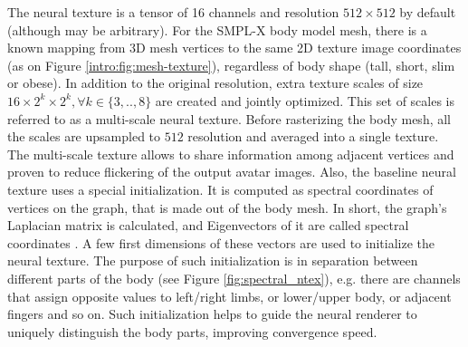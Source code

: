 
The neural texture is a tensor of 16 channels and resolution $512\times512$ by default (although may be arbitrary). For the SMPL-X body model mesh, there is a known mapping from 3D mesh vertices to the same 2D texture image coordinates (as on Figure \ref{intro:fig:mesh-texture}), regardless of body shape (tall, short, slim or obese). In addition to the original resolution, extra texture scales of size $16\times 2^k \times 2^k, \forall k \in \{3,..,8\}$ are created and jointly optimized. This set of scales is referred to as a multi-scale neural texture. Before rasterizing the body mesh, all the scales are upsampled to $512$ resolution and averaged into a single texture. The multi-scale texture allows to share information among adjacent vertices and proven to reduce flickering of the output avatar images. Also, the baseline neural texture uses a special initialization. It is computed as spectral coordinates of vertices on the graph, that is made out of the body mesh. In short, the graph's Laplacian matrix is calculated, and Eigenvectors of it are called spectral coordinates \cite{aux:spectral10}. A few first dimensions of these vectors are used to initialize the neural texture. The purpose of such initialization is in separation between different parts of the body (see Figure \ref{fig:spectral_ntex}), e.g. there are channels that assign opposite values to left/right limbs, or lower/upper body, or adjacent fingers and so on. Such initialization helps to guide the neural renderer to uniquely distinguish the body parts, improving convergence speed.

